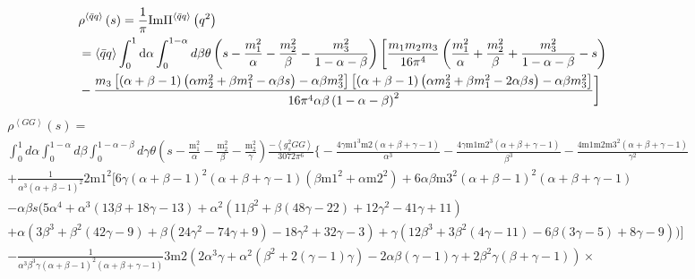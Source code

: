 \documentclass[prd,showpacs,showkeys,floatfix,amsmath,amssymb,floatfix,english]{revtex4}
\begin{document}
{\begin{align}
 & \rho^{\left\langle \bar{q}q\right\rangle }\left(s\right)=\frac{1}{\pi}\mathrm{Im}\Pi^{\left\langle \bar{q}q\right\rangle }\left(q^{2}\right)\nonumber \\
 & =\left\langle \bar{q}q\right\rangle \int_{0}^{1}{\rm d}\alpha\int_{0}^{1-\alpha}d\beta\theta\left(s-\frac{m_{1}^{2}}{\alpha}-\frac{m_{2}^{2}}{\beta}-\frac{m_{3}^{2}}{1-\alpha-\beta}\right)\biggl[\frac{m_{1}m_{2}m_{3}}{16\pi^{4}}\left(\frac{m_{1}^{2}}{\alpha}+\frac{m_{2}^{2}}{\beta}+\frac{m_{3}^{2}}{1-\alpha-\beta}-s\right)\nonumber \\
 & -\frac{m_{3}\left[\left(\alpha+\beta-1\right)\left(\alpha m_{2}^{2}+\beta m_{1}^{2}-\alpha\beta s\right)-\alpha\beta m_{3}^{2}\right]\left[\left(\alpha+\beta-1\right)\left(\alpha m_{2}^{2}+\beta m_{1}^{2}-2\alpha\beta s\right)-\alpha\beta m_{3}^{2}\right]}{16\pi^{4}\alpha\beta\left(1-\alpha-\beta\right)^{2}}\biggr]
\end{align}
}{\tiny{}
\begin{align}
 & \rho^{\left\langle GG\right\rangle }\left(s\right)=\nonumber \\
 & \int_{0}^{1}d\alpha\int_{0}^{1-\alpha}d\beta\int_{0}^{1-\alpha-\beta}d\gamma\theta\left(s-\frac{\text{m}_{1}^{2}}{\alpha}-\frac{\text{m}_{2}^{2}}{\beta}-\frac{\text{m}_{2}^{2}}{\gamma}\right)\frac{-\left\langle g_{s}^{2}GG\right\rangle }{3072\pi^{6}}\biggl\{-\frac{4\gamma\text{m1}^{3}\text{m2}(\alpha+\beta+\gamma-1)}{\alpha^{3}}-\frac{4\gamma\text{m1}\text{m2}^{3}(\alpha+\beta+\gamma-1)}{\beta^{3}}-\frac{4\text{m1}\text{m2}\text{m3}^{2}(\alpha+\beta+\gamma-1)}{\gamma^{2}}\nonumber \\
 & +\frac{1}{\alpha^{3}(\alpha+\beta-1)^{2}}2\text{m1}^{2}\biggl[6\gamma(\alpha+\beta-1)^{2}(\alpha+\beta+\gamma-1)\left(\beta\text{m1}^{2}+\alpha\text{m2}^{2}\right)+6\alpha\beta\text{m3}^{2}(\alpha+\beta-1)^{2}(\alpha+\beta+\gamma-1)\nonumber \\
 & -\alpha\beta s\biggl(5\alpha^{4}+\alpha^{3}(13\beta+18\gamma-13)+\alpha^{2}\left(11\beta^{2}+\beta(48\gamma-22)+12\gamma^{2}-41\gamma+11\right)\nonumber \\
 & +\alpha\left(3\beta^{3}+\beta^{2}(42\gamma-9)+\beta\left(24\gamma^{2}-74\gamma+9\right)-18\gamma^{2}+32\gamma-3\right)+\gamma\left(12\beta^{3}+3\beta^{2}(4\gamma-11)-6\beta(3\gamma-5)+8\gamma-9\right)\biggr)\biggr]\nonumber \\
 & -\frac{1}{\alpha^{3}\beta^{3}\gamma(\alpha+\beta-1)^{2}(\alpha+\beta+\gamma-1)}3\text{m2}\left(2\alpha^{3}\gamma+\alpha^{2}\left(\beta^{2}+2(\gamma-1)\gamma\right)-2\alpha\beta(\gamma-1)\gamma+2\beta^{2}\gamma(\beta+\gamma-1)\right)\times\nonumber \\

\end{align}}
\end{document}
